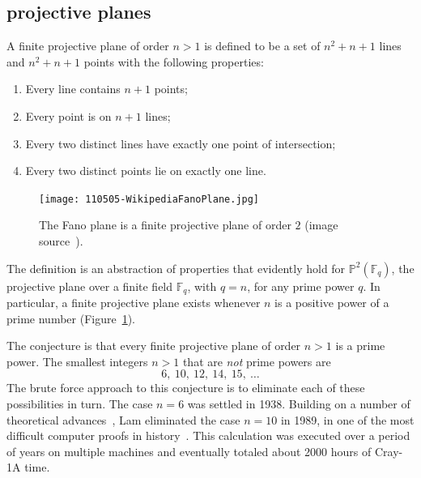 \documentclass{llncs}
\newcommand{\ring}[1]{\mathbb{#1}}
\begin{document}



\subsection{projective planes}

A finite projective plane of order $n>1$ is defined to be a set of
$n^2 + n + 1$ lines and $n^2 + n+ 1$ points with the following
properties:
\begin{enumerate}
\item Every line contains $n+1$ points;
\item Every point is on $n+1$ lines;
\item Every two distinct lines have exactly one point of intersection;
\item Every two distinct points lie on exactly one line.
\end{enumerate}

\begin{figure}[h!]
  \centering
\texttt{[image: 110505-WikipediaFanoPlane.jpg]}
\caption{The Fano plane is a finite projective plane of order $2$
  (image source~\cite{fano}).}
\label{fig:P2}
\end{figure}

The definition is an abstraction of properties that evidently hold for
$\ring{P}^2(\ring{F}_q)$, the projective plane over a finite field
$\ring{F}_q$, with $q=n$, for any prime power $q$.  In particular, a
finite projective plane exists whenever $n$ is a positive power of a
prime number (Figure~\ref{fig:P2}).

The conjecture is that every finite projective plane
of order $n>1$ is a prime power.  The smallest integers $n>1$
that are {\it not} prime powers are
\[
6,~10,~12,~14,~15,~\dots
\]
The brute force approach to this conjecture is to eliminate each of
these possibilities in turn.  The case $n=6$ was settled in 1938.
Building on a number of theoretical advances~\cite{MST}, Lam
eliminated the case $n=10$ in 1989, in one of the most difficult
computer proofs in history~\cite{Lam89}.  This calculation was
executed over a period of years on multiple machines and eventually
totaled about 2000 hours of Cray-1A time.
\end{document}
